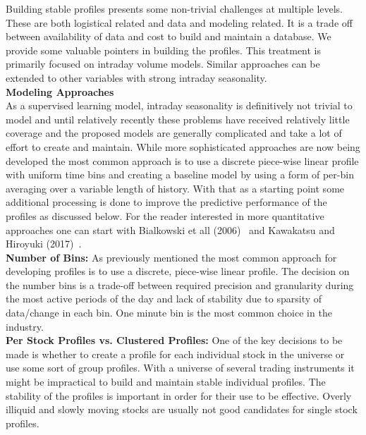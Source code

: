 Building stable profiles presents some non-trivial challenges at multiple levels. These are both logistical related and data and modeling related. It is a trade off between availability of data and cost to build and maintain a database. We provide some valuable pointers in building the profiles. This treatment is primarily focused on intraday volume models. Similar approaches can be extended to other variables with strong intraday seasonality. \\

\noindent\textbf{Modeling Approaches} \\

As a supervised learning model, intraday seasonality is definitively not trivial to model and until relatively recently these problems have received relatively little coverage and the proposed models are generally complicated and take a lot of effort to create and maintain. While more sophisticated approaches are now being developed the most common approach is to use a discrete piece-wise linear profile with uniform time bins and creating a baseline model by using a form of per-bin averaging over a variable length of history. With that as a starting point some additional processing is done to improve the predictive performance of the profiles as discussed below. For the reader interested in more quantitative approaches one can start with Bialkowski et all (2006)~\cite{bidafol} and Kawakatsu and Hiroyuki (2017)~\cite{kawhiro}. \\

\noindent\textbf{Number of Bins:} As previously mentioned the most common approach for developing profiles is to use a discrete, piece-wise linear profile. The decision on the number bins is a trade-off between required precision and granularity during the most active periods of the day and lack of stability due to sparsity of data/change in each bin. One minute bin is the most common choice in the industry. \\

\noindent\textbf{Per Stock Profiles vs. Clustered Profiles:} One of the key decisions to be made is whether to create a profile for each individual stock in the universe or use some sort of group profiles. With a universe of several trading instruments it might be impractical to build and maintain stable individual profiles. The stability of the profiles is important in order for their use to be effective. Overly illiquid and slowly moving stocks are usually not good candidates for single stock profiles. 

